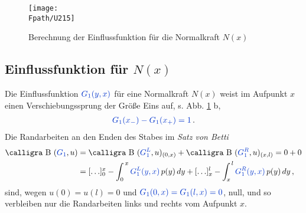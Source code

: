 \begin{figure}[tbp]
\centering
\if {} \sidecaption \fi
\texttt{[image: \\Fpath/U215]}
\caption{Berechnung der Einflussfunktion f\"{u}r die Normalkraft $N(x)$} \label{U215}
%
\end{figure}%
{\textcolor{sectionTitleBlue}{\subsection{Einflussfunktion f\"{u}r $N(x)$}}}
Die Einflussfunktion $\textcolor{chapterTitleBlue}{G_1(y,x)} $ f\"{u}r eine Normalkraft $N(x)$ weist im Aufpunkt $x$ einen Verschiebungssprung der Gr\"{o}{\ss}e Eins auf, s. Abb. \ref{U215} b,
\begin{align}
\textcolor{chapterTitleBlue}{G_1(x_{-}) - G_1(x_+) = 1}\,.
\end{align}
Die Randarbeiten an den Enden des Stabes im {\em Satz von Betti\/}
\begin{align}
\text{\normalfont\calligra B\,\,}(\textcolor{chapterTitleBlue}{G_1},u ) &= \text{\normalfont\calligra B\,\,}(\textcolor{chapterTitleBlue}{G_1^L},u)_{(0,x)} + \text{\normalfont\calligra B\,\,}(\textcolor{chapterTitleBlue}{G_1^R},u)_{(x,l)} = 0 + 0\nn \\
&= [\ldots]_0^x - \int_0^{\,x} \textcolor{chapterTitleBlue}{G_1^L(y,x)}\,p(y)\,dy + [\ldots]_x^l -  \int_x^{\,l} \textcolor{chapterTitleBlue}{G_1^R(y,x)}\,p(y)\,dy \,,
\end{align}
sind, wegen $u(0) = u(l) = 0$ und $\textcolor{chapterTitleBlue}{G_1(0,x) = G_1(l,x) = 0}$, null, und so verbleiben nur die Randarbeiten links und rechts vom Aufpunkt $x$.

